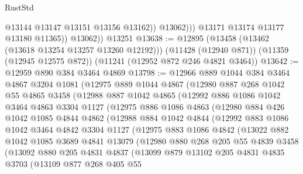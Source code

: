 \begin{lexlean}{RustStd}
\begin{coremodule}
{{{{{{{{{{{{{{{{{{{                      @13144
                      @13147
                      @13151
                      @13156
                      @13162))
                  @13062)))
            @13171
            @13174
            @13177
            @13180
            @11365))
        @13062))
    @13251
@13638 := @12895
    (@13458 (@13462 (@13618 @13254 @13257 @13260 @12192)))
    (@11428 (@12940 @871))
    (@11359 (@12945 @12575 @872))
    (@11241 (@12952 @872 @246 @4821 @3464))
@13642 := @12959 @890 @384 @3464 @4869
@13798 := @12966
    @889
    @1044
    @384
    @3464
    @4867
    @3204
    @1081
    (@12975
      @889
      @1044
      @4867
      (@12980
        @887
        @268
        @1042
        @55
        @4865
        @3458
        (@12988
          @887
          @1042
          @4865
          (@12992
            @886
            @1086
            @1042
            @3464
            @4863
            @3304
            @1127
            (@12975
              @886
              @1086
              @4863
              (@12980
                @884
                @426
                @1042
                @1085
                @4844
                @4862
                (@12988
                  @884
                  @1042
                  @4844
                  (@12992
                    @883
                    @1086
                    @1042
                    @3464
                    @4842
                    @3304
                    @1127
                    (@12975
                      @883
                      @1086
                      @4842
                      (@13022
                        @882
                        @1042
                        @1085
                        @3689
                        @4841
                        @13079
                        (@12980
                          @880
                          @268
                          @205
                          @55
                          @4839
                          @3458
                          (@13092
                            @880
                            @205
                            @4831
                            @4837
                            (@13099
                              @879
                              @13102
                              @205
                              @4831
                              @4835
                              @3703
                              (@13109
                                @877
                                @268
                                @405
                                @55
}}}}}}}}}}}}}}}}}}}
\end{coremodule}
\end{lexlean}
